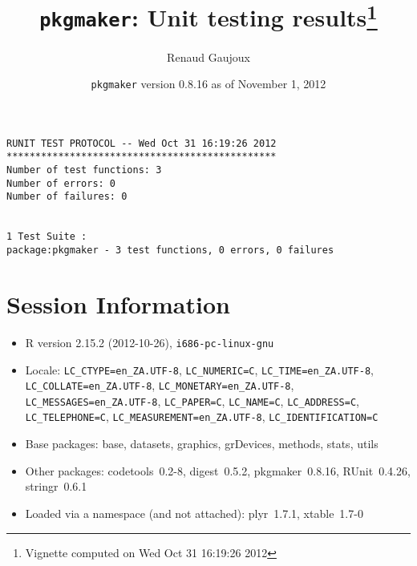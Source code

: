 \documentclass[10pt]{article}
\author{Renaud Gaujoux}
\title{\texttt{pkgmaker}: Unit testing results\footnote{Vignette computed  on Wed Oct 31 16:19:26 2012}}
\date{\texttt{pkgmaker} version 0.8.16 as of November  1, 2012}
\begin{document}
\maketitle

\begin{verbatim}
RUNIT TEST PROTOCOL -- Wed Oct 31 16:19:26 2012 
*********************************************** 
Number of test functions: 3 
Number of errors: 0 
Number of failures: 0 

 
1 Test Suite : 
package:pkgmaker - 3 test functions, 0 errors, 0 failures
\end{verbatim}

\section*{Session Information}
\begin{itemize}\raggedright
  \item R version 2.15.2 (2012-10-26), \verb|i686-pc-linux-gnu|
  \item Locale: \verb|LC_CTYPE=en_ZA.UTF-8|, \verb|LC_NUMERIC=C|, \verb|LC_TIME=en_ZA.UTF-8|, \verb|LC_COLLATE=en_ZA.UTF-8|, \verb|LC_MONETARY=en_ZA.UTF-8|, \verb|LC_MESSAGES=en_ZA.UTF-8|, \verb|LC_PAPER=C|, \verb|LC_NAME=C|, \verb|LC_ADDRESS=C|, \verb|LC_TELEPHONE=C|, \verb|LC_MEASUREMENT=en_ZA.UTF-8|, \verb|LC_IDENTIFICATION=C|
  \item Base packages: base, datasets, graphics, grDevices, methods,
    stats, utils
  \item Other packages: codetools~0.2-8, digest~0.5.2, pkgmaker~0.8.16,
    RUnit~0.4.26, stringr~0.6.1
  \item Loaded via a namespace (and not attached): plyr~1.7.1,
    xtable~1.7-0
\end{itemize}
\end{document}
